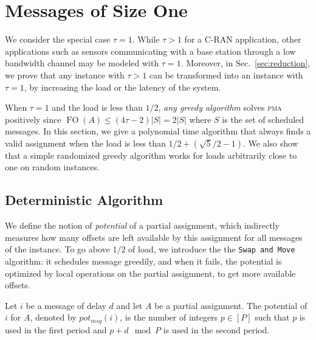 \documentclass[a4paper,UKenglish,cleveref, autoref, thm-restate]{lipics-v2019}
\DeclareMathOperator{\Fo}{FO}
\newcommand\pma{\textsc{pma}\xspace}
\newcommand\swapandmove{\texttt{Swap and Move}\xspace}
\begin{document}
\section{Messages of Size One} \label{sec:small}

We consider the special case $\tau = 1$. While $\tau > 1$ for a C-RAN application, other applications such as sensors communicating with a base station through a low bandwidth channel may be modeled with $\tau = 1$. Moreover, in Sec.~\ref{sec:reduction}, we prove that any instance with $\tau >1$ can be transformed into an instance with $\tau = 1$, by increasing the load or the latency of the system.

When $\tau = 1$ and the load is less than $1/2$, \emph{any greedy algorithm} solves \pma positively since $\Fo(A) \leq (4\tau -2)|S| = 2|S|$ where $S$ is the set of scheduled messages. In this section, we give a polynomial time algorithm that always finds a valid assignment when the load is less than $1/2 + (\sqrt{5}/2 -1)$. We also show that a simple randomized greedy algorithm
works for loads arbitrarily close to one on random instances.

\subsection{Deterministic Algorithm}

We define the notion of \emph{potential} of a partial assignment, which indirectly measures how many offsets are left available by this assignment for all messages of the instance. To go above $1/2$ of load, we introduce the
the \swapandmove algorithm: it schedules message greedily, and when it fails, the potential is optimized by local operations on the partial assignment, to get more available offsets. 

\begin{definition}
Let $i$ be a message of delay $d$ and let $A$ be a partial assignment.
The potential of $i$ for $A$, denoted by $pot_{msg}(i)$, is the number of integers $p \in [P]$ such that $p$ is used in the first period and $p+d \mod P$ is used in the second period. 
\end{definition}
\end{document}
